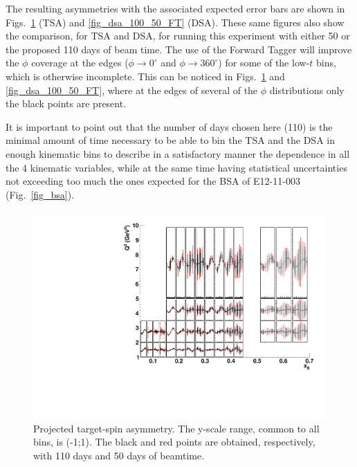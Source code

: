 The resulting asymmetries with the associated expected error bars are shown in Figs.~\ref{fig_tsa_100_50_FT} (TSA) and \ref{fig_dsa_100_50_FT} (DSA). These same figures also show the comparison, for TSA and DSA, for running this experiment with either 50 or the proposed 110 days of beam time. 
The use of the Forward Tagger will improve the $\phi$ coverage at the edges ($\phi\to 0^{\circ}$ and $\phi\to 360^{\circ}$) for some of the low-$t$ bins, which is otherwise incomplete. This can be noticed in Figs.~\ref{fig_tsa_100_50_FT} and \ref{fig_dsa_100_50_FT}, where at the edges of several of the $\phi$ distributions only the black points are present. 


It is important to point out that the number of days chosen here (110) is the minimal amount of time necessary to be able to bin the TSA and the DSA in enough kinematic bins to describe in a satisfactory manner the dependence in all the 4 kinematic variables, while at the same time having statistical uncertainties not exceeding too much the ones expected for the BSA of E12-11-003 (Fig.~\ref{fig_bsa}). 


\begin{figure}  
\begin{center}
\includegraphics[width=200mm]{asym_polndvcs_tsa_newvgg_100_FT_and_noFT_50days.pdf}
\caption[Projected target-spin asymetry]
{Projected target-spin asymmetry. The y-scale range, common to all bins, is (-1;1). The black and red points are obtained, respectively, with 110 days and 50 days of beamtime.}\label{fig_tsa_100_50_FT}
\end{center}
\end{figure}

